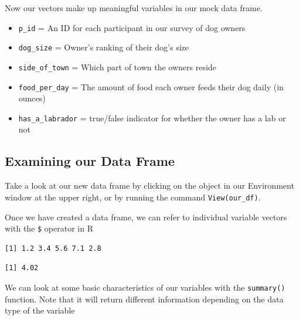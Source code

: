 \documentclass[
  letterpaper,
  DIV=11,
  numbers=noendperiod]{scrreprt}
\newenvironment{Shaded}{\begin{snugshade}}{\end{snugshade}}
\newcommand{\FunctionTok}[1]{\textcolor[rgb]{0.28,0.35,0.67}{#1}}
\newcommand{\NormalTok}[1]{\textcolor[rgb]{0.00,0.23,0.31}{#1}}
\newcommand{\SpecialCharTok}[1]{\textcolor[rgb]{0.37,0.37,0.37}{#1}}
\providecommand{\tightlist}{%
  \setlength{\itemsep}{0pt}\setlength{\parskip}{0pt}}
\begin{document}
Now our vectors make up meaningful variables in our mock data frame.

\begin{itemize}
\tightlist
\item
  \texttt{p\_id} = An ID for each participant in our survey of dog
  owners
\item
  \texttt{dog\_size} = Owner's ranking of their dog's size
\item
  \texttt{side\_of\_town} = Which part of town the owners reside
\item
  \texttt{food\_per\_day} = The amount of food each owner feeds their
  dog daily (in ounces)
\item
  \texttt{has\_a\_labrador} = true/false indicator for whether the owner
  has a lab or not
\end{itemize}

\subsection{Examining our Data Frame}\label{examining-our-data-frame}

Take a look at our new data frame by clicking on the object in our
Environment window at the upper right, or by running the command
\texttt{View(our\_df)}.

Once we have created a data frame, we can refer to individual variable
vectors with the \texttt{\$} operator in R

\begin{Shaded}
\end{Shaded}

\begin{verbatim}
[1] 1.2 3.4 5.6 7.1 2.8
\end{verbatim}

\begin{Shaded}
\end{Shaded}

\begin{verbatim}
[1] 4.02
\end{verbatim}

We can look at some basic characteristics of our variables with the
\texttt{summary()} function. Note that it will return different
information depending on the data type of the variable
\end{document}
